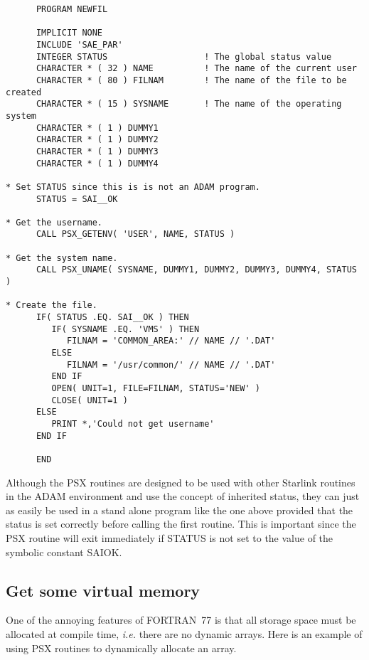 \documentclass[twoside,11pt]{article}
\newcommand{\xlabel}[1]{}
\renewcommand{\_}{\texttt{\symbol{95}}}
\begin{document}
\begin{small}
\begin{verbatim}
      PROGRAM NEWFIL

      IMPLICIT NONE
      INCLUDE 'SAE_PAR'
      INTEGER STATUS                   ! The global status value
      CHARACTER * ( 32 ) NAME          ! The name of the current user
      CHARACTER * ( 80 ) FILNAM        ! The name of the file to be created
      CHARACTER * ( 15 ) SYSNAME       ! The name of the operating system
      CHARACTER * ( 1 ) DUMMY1
      CHARACTER * ( 1 ) DUMMY2
      CHARACTER * ( 1 ) DUMMY3
      CHARACTER * ( 1 ) DUMMY4

* Set STATUS since this is is not an ADAM program.
      STATUS = SAI__OK

* Get the username.
      CALL PSX_GETENV( 'USER', NAME, STATUS )

* Get the system name.
      CALL PSX_UNAME( SYSNAME, DUMMY1, DUMMY2, DUMMY3, DUMMY4, STATUS )

* Create the file.
      IF( STATUS .EQ. SAI__OK ) THEN
         IF( SYSNAME .EQ. 'VMS' ) THEN
            FILNAM = 'COMMON_AREA:' // NAME // '.DAT'
         ELSE
            FILNAM = '/usr/common/' // NAME // '.DAT'
         END IF
         OPEN( UNIT=1, FILE=FILNAM, STATUS='NEW' )
         CLOSE( UNIT=1 )
      ELSE
         PRINT *,'Could not get username'
      END IF

      END
\end{verbatim}
\end{small}      
      
Although the PSX routines are designed to be used with other Starlink routines
in the ADAM environment and use the concept of inherited status, they can just
as easily be used in a stand alone program like the one above provided that the
status is set correctly before calling the first routine. This is important
since the PSX routine will exit immediately if STATUS is not set to the value
of the symbolic constant SAI\_\_OK.

\subsection{\xlabel{get_some_virtual_memory}Get some virtual memory}

One of the annoying features of FORTRAN~77 is that all storage space must be
allocated at compile time, \emph{i.e.} there are no dynamic arrays. Here is an
example of using PSX routines to dynamically allocate an array.
\end{document}
